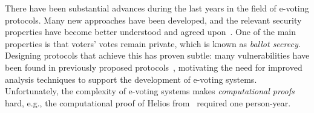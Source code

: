 


There have been substantial advances during the last years in the
field of e-voting protocols. Many new approaches have been developed,
and the relevant security properties have become better
understood and agreed upon~\cite{bernhard2015sok,cortier2016sok,cortier2013attacking,cortier2018voting}.
One of the main properties is that voters'
votes remain private, which is known as {\em ballot secrecy}. Designing
protocols that achieve this has proven subtle: many
vulnerabilities have been found in previously proposed
protocols~\cite{cortier2013attacking,KR-eurosp16},
motivating the need for improved analysis techniques to support the
development of e-voting systems. Unfortunately, the complexity of
e-voting systems makes {\em computational proofs} hard, e.g., the
computational proof of Helios from~\cite{cortier2017machine} required
one person-year. 

